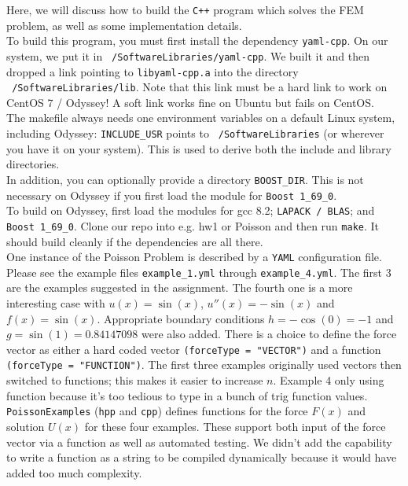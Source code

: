 Here, we will discuss how to build the \texttt{C++} program which solves the FEM problem, as well as some implementation details. \\

To build this program, you must first install the dependency \texttt{yaml-cpp}.  On our system, we put it in \texttt{~/SoftwareLibraries/yaml-cpp}.  We built it and then dropped a link pointing to \texttt{libyaml-cpp.a} into the directory \texttt{~/SoftwareLibraries/lib}.  Note that this link must be a hard link to work on CentOS 7 / Odyssey! A soft link works fine on Ubuntu but fails on CentOS. \\

The makefile always needs one environment variables on a default Linux system, including Odyssey: \texttt{INCLUDE\_USR} points to \texttt{~/SoftwareLibraries} (or wherever you have it on your system).  This is used to derive both the include and library directories. \\

In addition, you can optionally provide a directory \texttt{BOOST\_DIR}.  This is not necessary on Odyssey if you first load the module for \texttt{Boost 1\_69\_0}. \\

To build on Odyssey, first load the modules for gcc 8.2; \texttt{LAPACK / BLAS}; and \texttt{Boost 1\_69\_0}.  Clone our repo into e.g. hw1 or Poisson and then run \texttt{make}.  It should build cleanly if the dependencies are all there. \\

One instance of the Poisson Problem is described by a \texttt{YAML} configuration file.  Please see the example files \texttt{example\_1.yml} through \texttt{example\_4.yml}.  The first 3 are the examples suggested in the assignment.  The fourth one is a more interesting case with $u(x)  = \sin(x)$, $u''(x) = -\sin(x)$ and $f(x) = \sin(x)$.  Appropriate boundary conditions $h = -\cos(0) = -1$ and $g = \sin(1) = 0.84147098$ were also added.  There is a choice to define the force vector as either a hard coded vector \texttt{(forceType = "VECTOR")} and a function \texttt{(forceType = "FUNCTION")}.  The first three examples originally used vectors then switched to functions; this makes it easier to increase $n$.  Example 4 only using function because it's too tedious to type in a bunch of trig function values. \\

\texttt{PoissonExamples} (\texttt{hpp} and \texttt{cpp}) defines functions for the force $F(x)$ and solution $U(x)$ for these four examples.  These support both input of the force vector via a function as well as automated testing.  We didn't add the capability to write a function as a string to be compiled dynamically because it would have added too much complexity. \\

